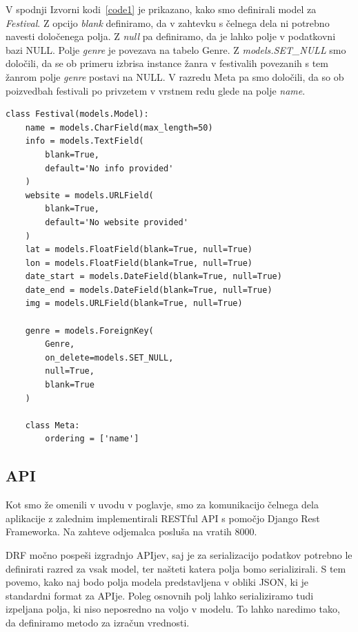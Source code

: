 \documentclass[a4paper,12pt,openright]{book}
\begin{document}
V spodnji Izvorni kodi~\ref{code1} je prikazano, kako smo definirali model za \textit{Festival}.
Z opcijo \textit{blank} definiramo, da v zahtevku s čelnega dela ni potrebno navesti določenega polja.
Z \textit{null} pa definiramo, da je lahko polje v podatkovni bazi NULL.
Polje \textit{genre} je povezava na tabelo Genre.
Z \textit{models.SET\_NULL} smo določili, da se ob primeru izbrisa instance žanra v festivalih povezanih s tem žanrom polje \textit{genre} postavi na NULL.
V razredu Meta pa smo določili, da so ob poizvedbah festivali po privzetem v vrstnem redu glede na polje \textit{name}.

\begin{lstlisting}[label=code1,caption=Primer kreiranja modela \textit{Festival} v Djangu.,frame=tb,captionpos=b]
class Festival(models.Model):
    name = models.CharField(max_length=50)
    info = models.TextField(
        blank=True, 
        default='No info provided'
    )
    website = models.URLField(
        blank=True,
        default='No website provided'
    )
    lat = models.FloatField(blank=True, null=True)
    lon = models.FloatField(blank=True, null=True)
    date_start = models.DateField(blank=True, null=True)
    date_end = models.DateField(blank=True, null=True)
    img = models.URLField(blank=True, null=True)

    genre = models.ForeignKey(
        Genre, 
        on_delete=models.SET_NULL, 
        null=True, 
        blank=True
    )

    class Meta:
        ordering = ['name']
\end{lstlisting}

\subsection{API}
Kot smo že omenili v uvodu v poglavje, smo za komunikacijo čelnega dela aplikacije z zalednim implementirali RESTful API s pomočjo Django Rest Frameworka.
Na zahteve odjemalca posluša na vratih 8000.

DRF močno pospeši izgradnjo APIjev, saj je za serializacijo podatkov potrebno le definirati razred za vsak model, ter našteti katera polja bomo serializirali.
S tem povemo, kako naj bodo polja modela predstavljena v obliki JSON, ki je standardni format za APIje.
Poleg osnovnih polj lahko serializiramo tudi izpeljana polja, ki niso neposredno na voljo v modelu.
To lahko naredimo tako, da definiramo metodo za izračun vrednosti.
\end{document}
